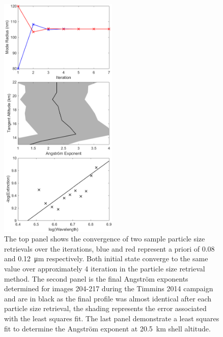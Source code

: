 \documentclass[12pt]{article}
\begin{document}
\newpage

\begin{figure}
\includegraphics[width=0.5\textwidth]{./Images/5-4-ParticalSize.pdf}
    \caption{The top panel shows the convergence of two sample particle size retrievals over the iterations, blue and red represent a priori of 0.08 and 0.12~\si{\micro\metre} respectively. Both initial state converge to the same value over approximately 4 iteration in the particle size retrieval method. The second panel is the final Angstr\"{o}m exponents determined for images 204-217 during the Timmins 2014 campaign and are in black as the final profile was almost identical after each particle size retrieval, the shading represents the error associated with the least squares fit. The last panel demonstrate a least squares fit to determine the Angstr\"{o}m exponent at 20.5~km shell altitude.}
    \label{fig:ParticleSize}
\end{figure}
\end{document}
